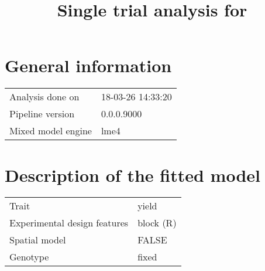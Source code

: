 \documentclass[a4paper,11pt]{article}\usepackage[]{graphicx}\usepackage[]{color}
\title{Single trial analysis for }%
\author{\vspace{-5ex}}
\date{\vspace{-5ex}}
\begin{document}



\maketitle

\singlespacing

\section{General information}
\begin{table}[ht]
\begin{flushleft}
\begin{tabular}{ll}
  Analysis done on & 18-03-26 14:33:20 \\ 
  Pipeline version & 0.0.0.9000 \\ 
  Mixed model engine & lme4 \\ 
  \end{tabular}
\label{general}
\end{flushleft}
\end{table}


\section{Description of the fitted model}

\begin{table}[ht]
\begin{flushleft}
\begin{tabular}{ll}
  Trait & yield \\ 
  Experimental design features & block (R) \\ 
  Spatial model & FALSE \\ 
  Genotype & fixed \\ 
  \end{tabular}
\label{modelDescription}
\end{flushleft}
\end{table}
\end{document}
